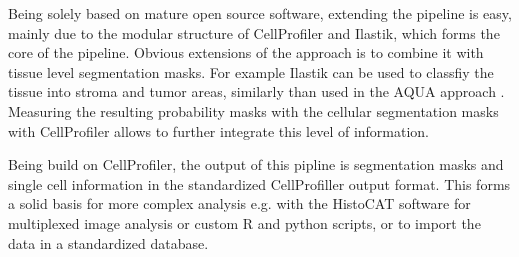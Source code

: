 \documentclass[a4paper]{article}
\begin{document}
Being solely based on mature open source software, extending the pipeline is easy, mainly due to
the modular structure of CellProfiler and Ilastik, which forms the core of the pipeline.
Obvious extensions of the approach is to combine it with tissue level segmentation masks.
For example Ilastik can be used to classfiy the tissue into stroma and tumor areas, similarly
than used in the AQUA approach \cite{mccabe_automated_2005}. Measuring the resulting probability masks with the
cellular segmentation masks with CellProfiler allows to further integrate this level of
information.

Being build on CellProfiler, the output of this pipline is segmentation masks and single cell information in the standardized
CellProfiller output format. This forms a solid basis for more complex analysis e.g. with the
HistoCAT software for multiplexed image analysis or custom R and python scripts, or to import the
data in a standardized database.
\end{document}
